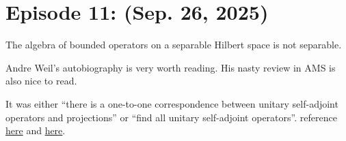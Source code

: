 \section{Episode 11: (Sep. 26, 2025)}
\begin{exercise}
    The algebra of bounded operators on a separable Hilbert space is not separable.
\end{exercise}
\noindent Andre Weil's autobiography is very worth reading. His nasty review in AMS is also nice to read.
\begin{exercise}
    It was either ``there is a one-to-one correspondence between unitary self-adjoint operators and projections'' or ``find all unitary self-adjoint operators''. reference \href{https://personal.math.ubc.ca/~feldman/m511/unboundedReview.pdf}{here} and \href{https://en.wikipedia.org/wiki/Stone%27s_theorem_on_one-parameter_unitary_groups}{here}.
\end{exercise}